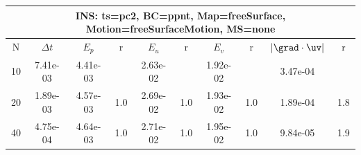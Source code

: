 
\begin{tabular}{|c|c|c|c|c|c|c|c|c|c|} \hline
 \multicolumn{10}{|c|}{INS: ts=pc2, BC=ppnt, Map=freeSurface, Motion=freeSurfaceMotion, MS=none } \\ \hline 
     N  &   $\Delta t$ & $E_p$   &  r  &   $E_u$   &   r    &   $E_v$   & r   &  $|\grad\cdot\uv|$  & r   \\ \hline 
  10   &  7.41e-03  &   4.41e-03  &        &   2.63e-02  &        &   1.92e-02  &        &   3.47e-04  &        \\ 
  20   &  1.89e-03  &   4.57e-03  & 1.0  &   2.69e-02  & 1.0  &   1.93e-02  & 1.0  &   1.89e-04  & 1.8  \\ 
  40   &  4.75e-04  &   4.64e-03  & 1.0  &   2.71e-02  & 1.0  &   1.95e-02  & 1.0  &   9.84e-05  & 1.9  \\ 
 \hline 
\end{tabular}
